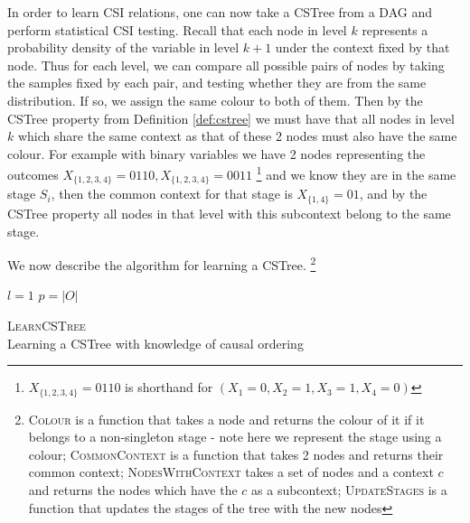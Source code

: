 \documentclass{tufte-book}
\begin{document}
In order to learn CSI relations, one can now take a CSTree from a DAG and perform statistical CSI testing. Recall that each node in level \(k\) represents a probability density of the variable in level \(k+1\) under the context fixed by that node. Thus for each level, we can compare all possible pairs of nodes by taking the samples fixed by each pair, and testing whether they are from the same distribution. If so, we assign the same colour to both of them. Then by the CSTree property from Definition \ref{def:cstree} we must have that all nodes in level \(k\) which share the same context as that of these 2 nodes must also have the same colour. For example with binary variables we have 2 nodes representing the outcomes \(X_{\{1,2,3,4\}}=0110, X_{\{1,2,3,4\}}=0011\)  \footnote{$X_{\{1,2,3,4\}}=0110$ is shorthand for $(X_1=0, X_2=1, X_3=1,X_4=0)$}   and we know they are in the same stage \(S_i\), then the common context for that stage is \(X_{\{1,4\}}=01\), and by the CSTree property all nodes in that level with this subcontext belong to the same stage. 


 \newpage 
We now describe the algorithm for learning a CSTree.  \footnote{\textsc{Colour} is a function that takes a node and returns the colour of it if it belongs to a non-singleton stage - note here we represent the stage using a colour; \textsc{CommonContext} is a function that takes 2 nodes and returns their common context; \textsc{NodesWithContext} takes a set of nodes and a context $c$ and returns the nodes which have the $c$ as a subcontext; \textsc{UpdateStages} is a function that updates the stages of the tree with the new nodes} 

\begin{algorithm}[H]\label{alg:learncstree}
\SetAlgoLined
{}
$l=1$\;
$p=|O|$\;
\caption{\textsc{LearnCSTree} \\ Learning a CSTree with knowledge of causal ordering}
\end{algorithm}
\end{document}
